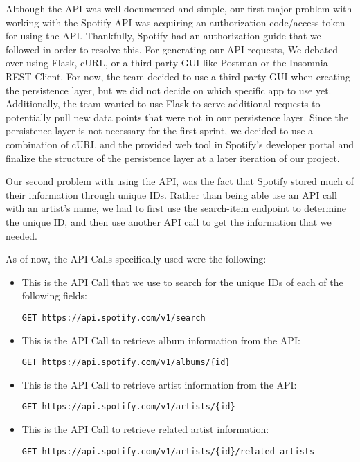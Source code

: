 \documentclass{scrartcl}
\begin{document}
Although the API was well documented and simple, our first major problem with working with the Spotify API was acquiring an authorization code/access token for using the API. Thankfully, Spotify had an authorization guide that we followed in order to resolve this. For generating our API requests, We debated over using Flask, cURL, or a third party GUI like Postman or the Insomnia REST Client. For now, the team decided to use a third party GUI when creating the persistence layer, but we did not decide on which specific app to use yet. Additionally, the team wanted to use Flask to serve additional requests to potentially pull new data points that were not in our persistence layer. Since the persistence layer is not necessary for the first sprint, we decided to use a combination of cURL and the provided web tool in Spotify’s developer portal and finalize the structure of the persistence layer at a later iteration of our project. 

Our second problem with using the API, was the fact that Spotify stored much of their information through unique IDs. Rather than being able use an API call with an artist’s name, we had to first use the search-item endpoint to determine the unique ID, and then use another API call to get the information that we needed.

As of now, the API Calls specifically used were the following:

\begin{itemize}
    \item This is the API Call that we use to search for the unique IDs of each of the following fields:
    \begin{verbatim}GET https://api.spotify.com/v1/search\end{verbatim}

    \item This is the API Call to retrieve album information from the API:
    \begin{verbatim}GET https://api.spotify.com/v1/albums/{id}\end{verbatim}

    \item This is the API Call to retrieve artist information from the API:
    \begin{verbatim}GET https://api.spotify.com/v1/artists/{id}\end{verbatim}

    \item This is the API Call to retrieve related artist information:
    \begin{verbatim}GET https://api.spotify.com/v1/artists/{id}/related-artists\end{verbatim}
\end{itemize}
\end{document}
